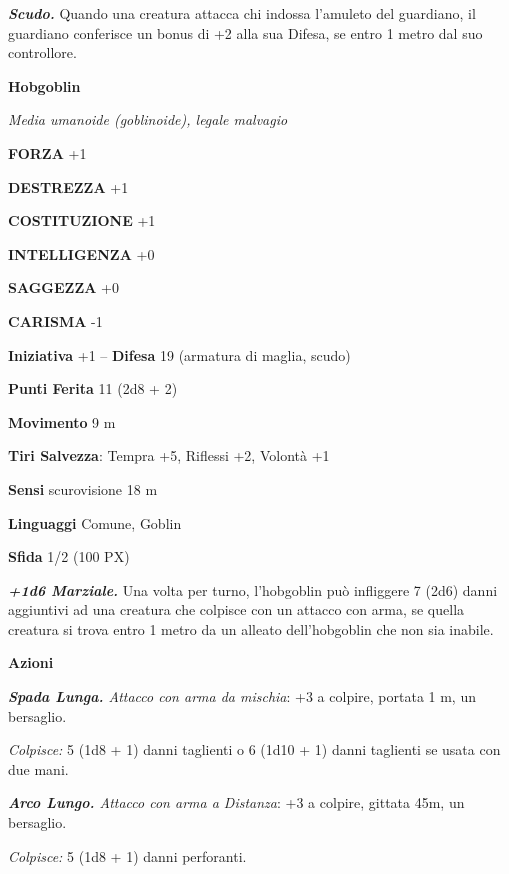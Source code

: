 \begin{multicols}{2}
\textit{\textbf{Scudo.}} Quando una creatura attacca chi indossa l'amuleto del guardiano, il guardiano conferisce un bonus di +2 alla sua Difesa, se entro 1 metro dal suo controllore.

\medskip{}\textbf{Hobgoblin}

\textit{Media umanoide (goblinoide), legale malvagio}

\textbf{FORZA} +1

\textbf{DESTREZZA} +1

\textbf{COSTITUZIONE} +1

\textbf{INTELLIGENZA} +0

\textbf{SAGGEZZA} +0

\textbf{CARISMA} -1

\textbf{Iniziativa} +1 -- \textbf{Difesa} 19 (armatura di maglia, scudo)

\textbf{Punti Ferita} 11 (2d8 + 2)

\textbf{Movimento} 9 m

\textbf{Tiri Salvezza}: Tempra +5, Riflessi +2, Volontà +1

\textbf{Sensi} scurovisione 18 m

\textbf{Linguaggi} Comune, Goblin

\textbf{Sfida} 1/2 (100 PX)

\textit{\textbf{+1d6 Marziale.}} Una volta per turno, l'hobgoblin può infliggere 7 (2d6) danni aggiuntivi ad una creatura che colpisce con un attacco con arma, se quella creatura si trova entro 1 metro da un alleato dell'hobgoblin che non sia inabile.

\textbf{Azioni}

\textit{\textbf{Spada Lunga.} Attacco con arma da mischia}: +3 a colpire, portata 1 m, un bersaglio.

\textit{Colpisce:} 5 (1d8 + 1) danni taglienti o 6 (1d10 + 1) danni taglienti se usata con due mani.

\textit{\textbf{Arco Lungo.} Attacco con arma a Distanza}: +3 a colpire, gittata 45m, un bersaglio.

\textit{Colpisce:} 5 (1d8 + 1) danni perforanti.


\end{multicols}
